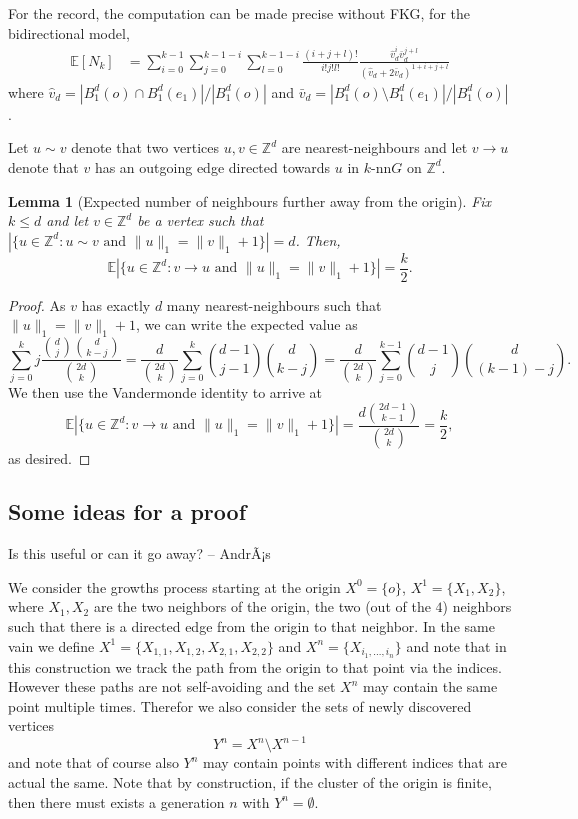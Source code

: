 \documentclass{article}
\newtheorem{lemma}[theorem]{Lemma}
\theoremstyle{definition}
\newcommand{\1}{\mathbbm{1}}
\newcommand{\E}{\mathbb{E}}
\newcommand{\0}{\mathbf{o}}
\newcommand{\Z}{\mathbb{Z}}
\newcommand*{\be}{\begin{equation}}
\newcommand*{\ee}{\end{equation}}
\begin{document}
For the record, the computation can be made precise without FKG, for the bidirectional model,
\begin{align*}
\mathbb E[N_k]&=\sum_{i=0}^{k-1}\sum_{j=0}^{k-1-i}\sum_{l=0}^{k-1-i}\frac{(i+j+l)!}{i!j!l!}\frac{\hat v_d^i\bar v_d^{j+l}}{(\hat v_d+2\bar v_d)^{1+i+j+l}}
\end{align*}
where $\hat v_d=|B^d_1(o)\cap B^d_1(e_1)|/|B^d_1(o)|$ and $\bar v_d=|B^d_1(o)\setminus B^d_1(e_1)|/|B^d_1(o)|$.

Let $u\sim v$ denote that two vertices $u,v\in \Z^d$ are nearest-neighbours and let $v\to u$ denote that $v$ has an outgoing edge directed towards $u$ in $k$-nn$G$ on $\Z^d$. 

\begin{lemma}[Expected number of neighbours further away from the origin]
	Fix $k\leq d$ and let $v\in \Z^d$ be a vertex such that $|\{u\in \Z^d: u\sim v\text{ and } \|u\|_1=\|v\|_1+1\}|=d$. Then, 
	\be 
	\E{|\{u\in \Z^d: v\rightarrow u\text{ and } \|u\|_1=\|v\|_1+1\}|}=\frac k2.
	\ee 
\end{lemma}

\begin{proof}
	As $v$ has exactly $d$ many nearest-neighbours such that $\|u\|_1=\|v\|_1+1$, we can write the expected value as 
	\be
	\sum_{j=0}^k j\frac{\binom{d}{j}\binom{d}{k-j}}{\binom{2d}{k}}=\frac{d}{\binom{2d}{k}}\sum_{j=0}^k \binom{d-1}{j-1}\binom{d}{k-j}=\frac{d}{\binom{2d}{k}}\sum_{j=0}^{k-1}\binom{d-1}{j}\binom{d}{(k-1)-j}.
	\ee 
	We then use the Vandermonde identity to arrive at 
	\be 
	\E{|\{u\in \Z^d: v\rightarrow u\text{ and } \|u\|_1=\|v\|_1+1\}|}=\frac{d\binom{2d-1}{k-1}}{\binom{2d}{k}}=\frac k2,
	\ee 
	as desired.
\end{proof} 

\subsection{Some ideas for a proof} \color{red} Is this useful or can it go away? -- AndrÃ¡s \color{black}

We consider the growths process starting at the origin $X^0=\{o\}$, $X^1=\{X_1,X_2\}$, where $X_1, X_2$ are the two neighbors of the origin, the two (out of the $4$) neighbors such that there is a directed edge from the origin to that neighbor. In the same vain we define $X^1=\{X_{1,1},X_{1,2},X_{2,1},X_{2,2}\}$ and  $X^n=\{X_{i_1,\dots,i_n}\}$ and note that in this construction we track the path from the origin to that point via the indices. However these paths are not self-avoiding and the set $X^n$ may contain the same point multiple times. Therefor we also consider the sets of newly discovered vertices
$$
Y^n=X^n\setminus X^{n-1} 
$$
and note that of course also $Y^n$ may contain points with different indices that are actual the same. Note that by construction, if the cluster of the origin is finite, then there must exists a generation $n$ with $Y^n=\emptyset$. 
\end{document}
